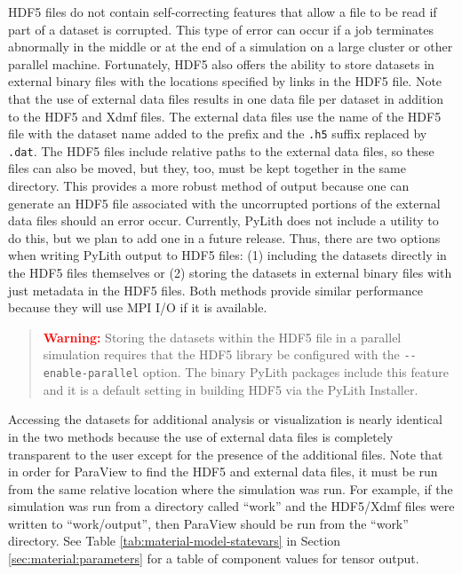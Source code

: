 HDF5 files do not contain self-correcting features that allow a file
to be read if part of a dataset is corrupted. This type of error can
occur if a job terminates abnormally in the middle or at the end of
a simulation on a large cluster or other parallel machine. Fortunately,
HDF5 also offers the ability to store datasets in external binary
files with the locations specified by links in the HDF5 file. Note
that the use of external data files results in one data file per dataset
in addition to the HDF5 and Xdmf files. The external data files use
the name of the HDF5 file with the dataset name added to the prefix
and the \texttt{.h5} suffix replaced by \texttt{.dat}. The HDF5 files
include relative paths to the external data files, so these files
can also be moved, but they, too, must be kept together in the same
directory. This provides a more robust method of output because one
can generate an HDF5 file associated with the uncorrupted portions
of the external data files should an error occur. Currently, PyLith
does not include a utility to do this, but we plan to add one in a
future release. Thus, there are two options when writing PyLith output
to HDF5 files: (1) including the datasets directly in the HDF5 files
themselves or (2) storing the datasets in external binary files with
just metadata in the HDF5 files. Both methods provide similar performance
because they will use MPI I/O if it is available. 
\begin{quote}
\textbf{\textcolor{red}{Warning:}}\textbf{ }Storing the datasets within
the HDF5 file in a parallel simulation requires that the HDF5 library
be configured with the \texttt{-{}-enable-parallel} option. The binary
PyLith packages include this feature and it is a default setting in
building HDF5 via the PyLith Installer.
\end{quote}
Accessing the datasets for additional analysis or visualization is
nearly identical in the two methods because the use of external data
files is completely transparent to the user except for the presence
of the additional files. Note that in order for ParaView to find the
HDF5 and external data files, it must be run from the same relative
location where the simulation was run. For example, if the simulation
was run from a directory called ``work'' and the HDF5/Xdmf files
were written to ``work/output'', then ParaView should be run from
the ``work'' directory. See Table \vref{tab:material-model-statevars}
in Section \vref{sec:material:parameters} for a table of component
values for tensor output.



